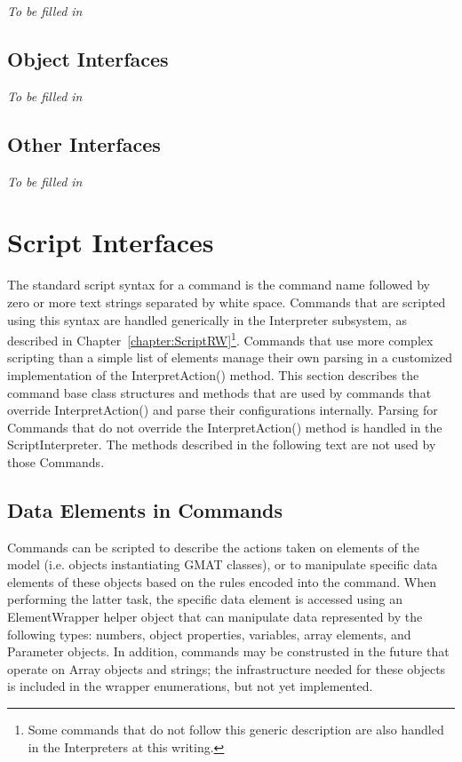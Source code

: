 \textit{To be filled in}

\subsection{Object Interfaces}

\textit{To be filled in}

\subsection{Other Interfaces}

\textit{To be filled in}

\section{Script Interfaces}

The standard script syntax for a command is the command name followed by zero or more text strings
separated by white space.  Commands that are scripted using this syntax are handled generically in
the Interpreter subsystem, as described in Chapter~\ref{chapter:ScriptRW}\footnote{Some commands
that do not follow this generic description are also handled in the Interpreters at this writing.}.
Commands that use more complex scripting than a simple list of elements manage their own parsing in
a customized implementation of the InterpretAction() method.  This section describes the command
base class structures and methods that are used by commands that override InterpretAction() and
parse their configurations internally.  Parsing for Commands that do not override the
InterpretAction() method is handled in the ScriptInterpreter.  The methods described in the
following text are not used by those Commands.

\subsection{\label{section:ParametersInCommands}Data Elements in Commands}

Commands can be scripted to describe the actions taken on elements of the model (i.e. objects
instantiating GMAT classes), or to manipulate specific data elements of these objects based on the
rules encoded into the command.  When performing the latter task, the specific data element is
accessed using an ElementWrapper helper object that can manipulate data represented by the
following types: numbers, object properties, variables, array elements, and Parameter objects.  In
addition, commands may be construsted in the future that operate on Array objects and strings; the
infrastructure needed for these objects is included in the wrapper enumerations, but not yet
implemented.

